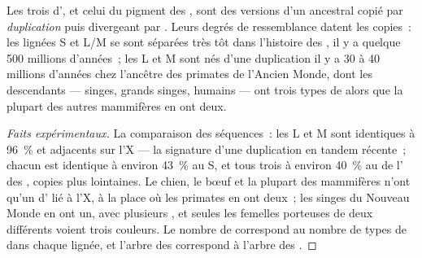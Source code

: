 \begin{proposition}\label{prop:g11:the-eye:family}
Les trois  d', et celui du pigment des , sont des
versions d'un  ancestral copié par \emph{duplication} puis
divergeant par . Leurs degrés de ressemblance datent les
copies~: les lignées S et L/M se sont séparées très tôt dans l'histoire
des , il y a quelque 500 millions d'années~; les  L et M
sont nés d'une duplication il y a 30 à 40 millions d'années chez
l'ancêtre des primates de l'Ancien Monde, dont les descendants ---
singes, grands singes, humains --- ont trois types de  alors que
la plupart des autres mammifères en ont deux.
\end{proposition}
\begin{proof}[Faits expérimentaux]
La comparaison des séquences~: les  L et M sont identiques à
96~\% et adjacents sur l'X --- la signature d'une duplication en
tandem récente~; chacun est identique à environ 43~\% au  S, et
tous trois à environ 40~\% au  de l' des , copies
plus lointaines. Le chien, le bœuf et la plupart des mammifères
n'ont qu'un  d' lié à l'X, à la place où les primates en ont
deux~; les singes du Nouveau Monde en ont un, avec plusieurs ,
et seules les femelles porteuses de deux  différents voient
trois couleurs. Le nombre de  correspond au nombre de types de
 dans chaque lignée, et l'arbre des  correspond à l'arbre des
.
\end{proof}

